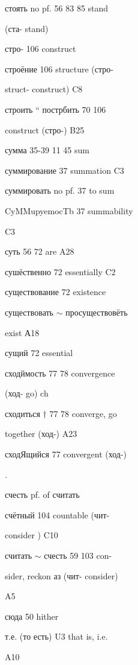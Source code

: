 \begin{minipage}[t]{0.475\textwidth}
\raggedright
\noindent стоять no pf. 56 83 85 stand\par
\noindent (ста- stand)\par
\noindent стро- 106 construct\par
\noindent строёние 106 structure (стро-\par
\noindent struct- construct) C8\par
\noindent строить “ пострбить 70 106\par
\noindent construct (стро-) B25\par
\noindent сумма 35-39 11 45 sum\par
\noindent суммирование 37 summation C3\par
\noindent суммировать no pf. 37 to sum\par
\noindent CyMMupyemocTb 37 summability\par
\noindent C3\par
\noindent суть 56 72 are A28\par
\noindent сушёственно 72 essentially C2\par
\noindent существование 72 existence\par
\noindent существовать $\sim$ просуществовёть\par
{} exist А18\par
\noindent сущий 72 essential\par
\noindent сходймость 77 78 convergence\par
\noindent (ход- go) ch\par
\noindent сходиться $\dagger$ 77 78 converge, go\par
\noindent together (ход-) A23\par
\noindent сходЯщийся 77 convergent (ход-)\par
{} .\par
\noindent счесть pf. of считать\par
\noindent счётный 104 countable (чит-\par
\noindent consider ) C10\par
\noindent считать $\sim$ счесть 59 103 con-\par
\noindent sider, reckon аз (чит- consider)\par
\noindent A5\par
\noindent сюда 50 hither\par
\noindent т.е. (то есть) U3 that is, i.e.\par
\noindent A10\par

\end{minipage}

